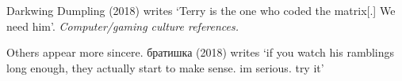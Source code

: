 \documentclass[Draft.tex]{subfiles}
\begin{document}
Darkwing Dumpling (2018) writes
`Terry is the one who coded the matrix[.] We need him'.
\textit{Computer/gaming culture references.}

Others appear more sincere.
братишка (2018) writes `if you watch his ramblings long enough,
they actually start to make sense. im serious. try it'




\end{document}
